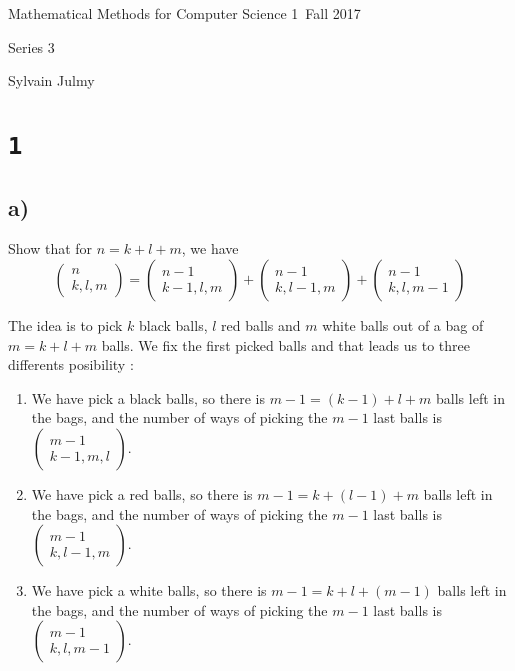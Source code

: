 \documentclass[a4paper,11pt]{report}
\author{Sylvain Julmy}
\date{\today}
\begin{document}
\begin{center}
  \Large{
    Mathematical Methods for Computer Science 1\
    Fall 2017
  }
  \noindent\makebox[\linewidth]{\rule{\linewidth}{0.4pt}}

  Series 3
  \vspace*{1.4cm}

  Sylvain Julmy
  
  \noindent\makebox[\linewidth]{\rule{\linewidth}{0.4pt}}
\end{center}

\section*{\texttt{1}}
\subsection*{a)}

Show that for $n = k + l + m$, we have
$$
\begin{pmatrix} n \\ k,l,m\end{pmatrix} = \begin{pmatrix} n-1 \\
  k-1,l,m\end{pmatrix} + \begin{pmatrix} n-1 \\ k,l-1,m\end{pmatrix} + \begin{pmatrix} n-1 \\ k,l,m-1\end{pmatrix}
$$

The idea is to pick $k$ black balls, $l$ red balls and $m$ white balls out of a
bag of $m = k + l + m$ balls. We fix the first picked balls and that leads us to
three differents posibility :
\begin{enumerate}
\item We have pick a black balls, so there is $m-1 = (k-1) + l + m$ balls left in
  the bags, and the number of ways of picking the $m-1$ last balls is
  $\begin{pmatrix} m-1 \\ k-1,m,l\end{pmatrix}$.
\item We have pick a red balls, so there is $m-1 = k + (l-1) + m$ balls left in
  the bags, and the number of ways of picking the $m-1$ last balls is
  $\begin{pmatrix} m-1 \\ k,l-1,m\end{pmatrix}$.
\item We have pick a white balls, so there is $m-1 = k + l + (m-1)$ balls left in
  the bags, and the number of ways of picking the $m-1$ last balls is
  $\begin{pmatrix} m-1 \\ k,l,m-1\end{pmatrix}$.
\end{enumerate}
\end{document}
